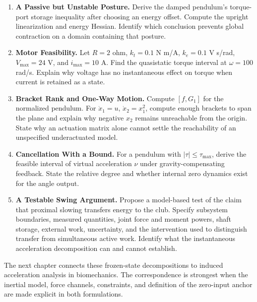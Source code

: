 \begin{enumerate}
\item \textbf{A Passive but Unstable Posture.} Derive the damped pendulum's torque-port storage inequality after choosing an energy offset. Compute the upright linearization and energy Hessian. Identify which conclusion prevents global contraction on a domain containing that posture.
\item \textbf{Motor Feasibility.} Let $R=2$ ohm, $k_t=0.1$ N m/A, $k_e=0.1$ V s/rad, $V_{\max}=24$ V, and $i_{\max}=10$ A. Find the quasistatic torque interval at $\omega=100$ rad/s. Explain why voltage has no instantaneous effect on torque when current is retained as a state.
\item \textbf{Bracket Rank and One-Way Motion.} Compute $[f,G_1]$ for the normalized pendulum. For $\dot x_1=u$, $\dot x_2=x_1^2$, compute enough brackets to span the plane and explain why negative $x_2$ remains unreachable from the origin. State why an actuation matrix alone cannot settle the reachability of an unspecified underactuated model.
\item \textbf{Cancellation With a Bound.} For a pendulum with $|\tau|\le\tau_{\max}$, derive the feasible interval of virtual acceleration $\nu$ under gravity-compensating feedback. State the relative degree and whether internal zero dynamics exist for the angle output.
\item \textbf{A Testable Swing Argument.} Propose a model-based test of the claim that proximal slowing transfers energy to the club. Specify subsystem boundaries, measured quantities, joint force and moment powers, shaft storage, external work, uncertainty, and the intervention used to distinguish transfer from simultaneous active work. Identify what the instantaneous acceleration decomposition can and cannot establish.
\end{enumerate}

The next chapter connects these frozen-state decompositions to induced acceleration analysis in biomechanics. The correspondence is strongest when the inertial model, force channels, constraints, and definition of the zero-input anchor are made explicit in both formulations.
